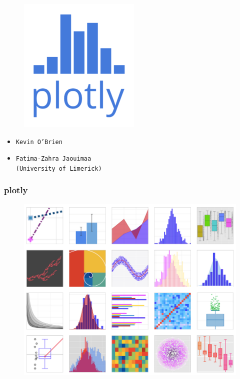 \documentclass{beamer}
\begin{document}
	\begin{frame}
		\vspace{-0.5cm}
\begin{figure}
\centering
\includegraphics[width=0.55\linewidth]{plotlylogo}
\end{figure}

	\Large
\begin{itemize}
	\item \texttt{Kevin O'Brien} 
	
	\item \texttt{Fatima-Zahra Jaouimaa} \\ {\large \texttt{(University of Limerick)}}
\end{itemize}	
	
\end{frame}
\begin{frame}
	\frametitle{plotly}
	\large		
	\begin{figure}
		\centering
		\includegraphics[width=0.8\linewidth]{plotlygallery}
	\end{figure}
	
\end{frame}
\end{document}

